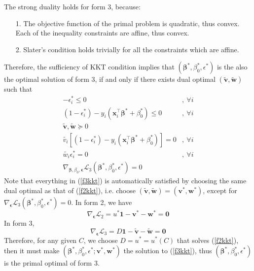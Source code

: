 \documentclass[11pt]{article}
\begin{document}
The strong duality holds for form 3, because: 
\begin{itemize}
  \item[1.] The objective function of the primal problem is quadratic, thus convex. Each of the inequality constraints are affine, thus convex.
  \item[2.] Slater's condition holds trivially for all the constraints which are affine.
\end{itemize}
Therefore, the sufficiency of KKT condition implies that $(\bm{\beta}^*, \beta^*_0, \epsilon^*)$ is the also the optimal solution of form 3, if and only if there exists dual optimal $(\widetilde{\bm{v}}, \widetilde{\bm{w}})$ such that 
\begin{equation}\label{f3kkt}
  \begin{split}
  -\epsilon_i^* \leq 0 &,~\forall i \\
  (1- \epsilon_i^*) - y_i(\bm{x}_i^{\top} \bm{\beta}^* + \beta_0^*) \leq 0 &,~\forall i\\
  \widetilde{\bm{v}}, \widetilde{\bm{w}} \succeq 0\\
  \widetilde{v_i}[(1- \epsilon_i^*) - y_i(\bm{x}_i^{\top} \bm{\beta}^* + \beta_0^*)] = 0 &,~\forall i\\
   \widetilde{w_i} \epsilon_i^* = 0 &,~\forall i\\
    \nabla_{ \bm{\beta}, \beta_0, \bm{\epsilon} } \mathcal{L}_3(\bm{\beta}^*, \beta^*_0, \epsilon^*) = 0 &
  \end{split}
\end{equation}
Note that everything in (\ref{f3kkt}) is automatically satisfied by choosing the same dual optimal as that of (\ref{f2kkt}), i.e. choose $(\widetilde{\bm{v}}, \widetilde{\bm{w}})=(\bm{v}^*, \bm{w}^*) $, except for $\nabla_{ \bm{\epsilon}}\mathcal{L}_3(\bm{\beta}^*, \beta^*_0, \epsilon^*) = 0$. In form 2, we have
\begin{equation}
  \nabla_{ \bm{\epsilon}}\mathcal{L}_2 = u^* \bm{1} - \bm{v}^* - \bm{w}^* = \bm{0}
\end{equation}
In form 3, 
\begin{equation}\label{gradeps}
  \nabla_{ \bm{\epsilon}}\mathcal{L}_3 = D \bm{1} - \widetilde{\bm{v}} - \widetilde{\bm{w}} = \bm{0}
\end{equation}
Therefore, for any given $C$, we choose $D = u^* = u^*(C)$ that solves (\ref{f2kkt}), then it must make $(\bm{\beta}^*, \beta^*_0, \epsilon^*;  \bm{v}^*, \bm{w}^*)$ the solution to (\ref{f3kkt}), thus $(\bm{\beta}^*, \beta^*_0, \epsilon^*)$ is the primal optimal of form 3.\\
\end{document}
